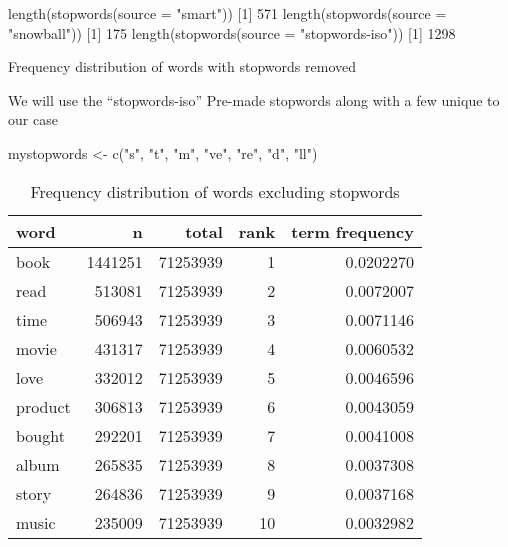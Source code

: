 \documentclass[
]{article}
\newenvironment{Shaded}{}{}
\newcommand{\AttributeTok}[1]{\textcolor[rgb]{0.49,0.56,0.16}{#1}}
\newcommand{\DecValTok}[1]{\textcolor[rgb]{0.25,0.63,0.44}{#1}}
\newcommand{\FunctionTok}[1]{\textcolor[rgb]{0.02,0.16,0.49}{#1}}
\newcommand{\NormalTok}[1]{#1}
\newcommand{\OtherTok}[1]{\textcolor[rgb]{0.00,0.44,0.13}{#1}}
\newcommand{\StringTok}[1]{\textcolor[rgb]{0.25,0.44,0.63}{#1}}
\begin{document}
\begin{Shaded}
\begin{Highlighting}[]
\FunctionTok{length}\NormalTok{(}\FunctionTok{stopwords}\NormalTok{(}\AttributeTok{source =} \StringTok{"smart"}\NormalTok{))}
\NormalTok{[}\DecValTok{1}\NormalTok{] }\DecValTok{571}
\FunctionTok{length}\NormalTok{(}\FunctionTok{stopwords}\NormalTok{(}\AttributeTok{source =} \StringTok{"snowball"}\NormalTok{))}
\NormalTok{[}\DecValTok{1}\NormalTok{] }\DecValTok{175}
\FunctionTok{length}\NormalTok{(}\FunctionTok{stopwords}\NormalTok{(}\AttributeTok{source =} \StringTok{"stopwords{-}iso"}\NormalTok{))}
\NormalTok{[}\DecValTok{1}\NormalTok{] }\DecValTok{1298}
\end{Highlighting}
\end{Shaded}

Frequency distribution of words with stopwords removed

We will use the ``stopwords-iso'' Pre-made stopwords along with a few
unique to our case

\begin{Shaded}
\begin{Highlighting}[]
\NormalTok{mystopwords }\OtherTok{\textless{}{-}} \FunctionTok{c}\NormalTok{(}\StringTok{"s"}\NormalTok{, }\StringTok{"t"}\NormalTok{, }\StringTok{"m"}\NormalTok{, }\StringTok{"ve"}\NormalTok{, }\StringTok{"re"}\NormalTok{, }\StringTok{"d"}\NormalTok{, }\StringTok{"ll"}\NormalTok{)}
\end{Highlighting}
\end{Shaded}

\begin{table}

\caption{\label{tab:freq_dist_ngrams_stopwords}Frequency distribution of words excluding stopwords\label{tbl:train_words_sw}}
\centering
\begin{tabular}[t]{lrrrr}
\toprule
word & n & total & rank & term frequency\\
\midrule
book & 1441251 & 71253939 & 1 & 0.0202270\\
read & 513081 & 71253939 & 2 & 0.0072007\\
time & 506943 & 71253939 & 3 & 0.0071146\\
movie & 431317 & 71253939 & 4 & 0.0060532\\
love & 332012 & 71253939 & 5 & 0.0046596\\
product & 306813 & 71253939 & 6 & 0.0043059\\
bought & 292201 & 71253939 & 7 & 0.0041008\\
album & 265835 & 71253939 & 8 & 0.0037308\\
story & 264836 & 71253939 & 9 & 0.0037168\\
music & 235009 & 71253939 & 10 & 0.0032982\\
\bottomrule
\end{tabular}
\end{table}
\end{document}
